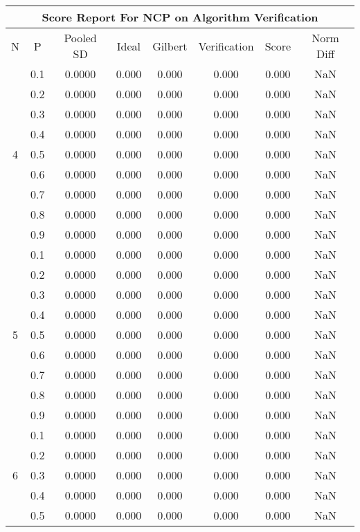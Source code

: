 \documentclass[11pt,a4paper]{report}
\begin{document}
\begin{longtable}{ | c | c || c | c | c | c | c | c | }
\hline
\multicolumn{8}{|c|}{ Score Report For NCP on Algorithm Verification} \\
\hline
N & P & Pooled SD &  Ideal &  Gilbert & Verification  & Score & Norm Diff \\
 \hline
 \hline
 \endhead
\multirow{9}{*}{4} & 0.1 & 0.0000 & 0.000 & 0.000 & 0.000 & 0.000 & NaN \\
 & 0.2 & 0.0000 & 0.000 & 0.000 & 0.000 & 0.000 & NaN \\
 & 0.3 & 0.0000 & 0.000 & 0.000 & 0.000 & 0.000 & NaN \\
 & 0.4 & 0.0000 & 0.000 & 0.000 & 0.000 & 0.000 & NaN \\
 & 0.5 & 0.0000 & 0.000 & 0.000 & 0.000 & 0.000 & NaN \\
 & 0.6 & 0.0000 & 0.000 & 0.000 & 0.000 & 0.000 & NaN \\
 & 0.7 & 0.0000 & 0.000 & 0.000 & 0.000 & 0.000 & NaN \\
 & 0.8 & 0.0000 & 0.000 & 0.000 & 0.000 & 0.000 & NaN \\
 & 0.9 & 0.0000 & 0.000 & 0.000 & 0.000 & 0.000 & NaN \\
 \hline
\multirow{9}{*}{5} & 0.1 & 0.0000 & 0.000 & 0.000 & 0.000 & 0.000 & NaN \\
 & 0.2 & 0.0000 & 0.000 & 0.000 & 0.000 & 0.000 & NaN \\
 & 0.3 & 0.0000 & 0.000 & 0.000 & 0.000 & 0.000 & NaN \\
 & 0.4 & 0.0000 & 0.000 & 0.000 & 0.000 & 0.000 & NaN \\
 & 0.5 & 0.0000 & 0.000 & 0.000 & 0.000 & 0.000 & NaN \\
 & 0.6 & 0.0000 & 0.000 & 0.000 & 0.000 & 0.000 & NaN \\
 & 0.7 & 0.0000 & 0.000 & 0.000 & 0.000 & 0.000 & NaN \\
 & 0.8 & 0.0000 & 0.000 & 0.000 & 0.000 & 0.000 & NaN \\
 & 0.9 & 0.0000 & 0.000 & 0.000 & 0.000 & 0.000 & NaN \\
 \hline
\multirow{9}{*}{6} & 0.1 & 0.0000 & 0.000 & 0.000 & 0.000 & 0.000 & NaN \\
 & 0.2 & 0.0000 & 0.000 & 0.000 & 0.000 & 0.000 & NaN \\
 & 0.3 & 0.0000 & 0.000 & 0.000 & 0.000 & 0.000 & NaN \\
 & 0.4 & 0.0000 & 0.000 & 0.000 & 0.000 & 0.000 & NaN \\
 & 0.5 & 0.0000 & 0.000 & 0.000 & 0.000 & 0.000 & NaN \\

\end{longtable}
\end{document}
